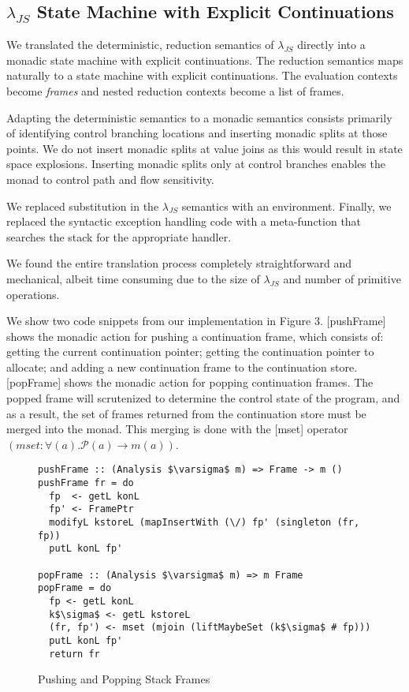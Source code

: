 \documentclass[10pt,letter,english]{article}
\newcommand{\lambdajs}[0]{$\lambda_{JS}$}
\begin{document}
\subsection{\lambdajs{} State Machine with Explicit Continuations}

We translated the deterministic, reduction semantics of \lambdajs{} directly
into a monadic state machine with explicit continuations. The reduction
semantics maps naturally to a state machine with explicit continuations. The
evaluation contexts become \emph{frames} and nested reduction contexts become a
list of frames.

Adapting the deterministic semantics to a monadic semantics consists primarily
of identifying control branching locations and inserting monadic splits at those
points. We do not insert monadic splits at value joins as this would result in
state space explosions. Inserting monadic splits only at control branches
enables the monad to control path and flow sensitivity.

We replaced substitution in the \lambdajs{} semantics with an
environment. Finally, we replaced the syntactic exception handling code with a
meta-function that searches the stack for the appropriate handler.

We found the entire translation process completely straightforward and
mechanical, albeit time consuming due to the size of \lambdajs{} and number of
primitive operations.

We show two code snippets from our implementation in Figure 3.
[pushFrame] shows the monadic action for pushing a continuation frame, which
consists of: getting the current continuation pointer; getting the 
continuation pointer to allocate; and adding a new continuation frame to the
continuation store.
[popFrame] shows the monadic action for popping continuation frames. The popped
frame will scrutenized to determine the  control state of the program, and
as a result, the set of frames returned from the continuation store must be
merged into the monad. This merging is done with the [mset] operator 
$(mset : \forall(a). \mathcal{P}(a) \rightarrow m(a))$.

\begin{figure}
\centering

\begin{lstlisting}
pushFrame :: (Analysis $\varsigma$ m) => Frame -> m ()
pushFrame fr = do
  fp  <- getL konL
  fp' <- FramePtr
  modifyL kstoreL (mapInsertWith (\/) fp' (singleton (fr, fp))
  putL konL fp'

popFrame :: (Analysis $\varsigma$ m) => m Frame
popFrame = do
  fp <- getL konL
  k$\sigma$ <- getL kstoreL
  (fr, fp') <- mset (mjoin (liftMaybeSet (k$\sigma$ # fp)))
  putL konL fp'
  return fr
\end{lstlisting}
\caption{Pushing and Popping Stack Frames}
\end{figure}
\end{document}
